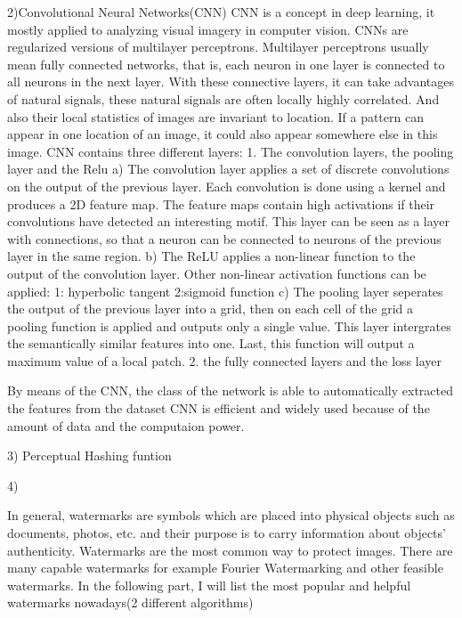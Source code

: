 2)Convolutional Neural Networks(CNN) %
CNN is a concept in deep learning, it mostly applied to analyzing visual imagery in computer vision.
CNNs are regularized versions of multilayer perceptrons. 
Multilayer perceptrons usually mean fully connected networks, that is, each neuron in one layer is connected to all neurons in the next layer. %
With these connective layers, it can take advantages of natural signals, 
these natural signals are often locally highly correlated.
And also their local statistics of images are invariant to location. 
If a pattern can appear in one location of an image, it could also appear somewhere else in this image.
CNN contains three different layers:
1. The convolution layers, the pooling layer and the Relu
a) The convolution layer applies a set of discrete convolutions on the output of the previous layer. 
Each convolution is done using a kernel and produces a 2D feature map. 
The feature maps contain high activations if their convolutions have detected an interesting motif. 
This layer can be seen as a layer with connections, 
so that a neuron can be connected to neurons of the previous layer in the same region. 
b) The ReLU applies a non-linear function to the output of the convolution layer. 
Other non-linear activation functions can be applied: 1: hyperbolic tangent 2:sigmoid function 
c) The pooling layer seperates the output of the previous layer into a grid, 
then on each cell of the grid a pooling function is applied and outputs only a single value.
This layer intergrates the semantically similar features into one.
Last, this function will output a maximum value of a local patch.
2. the fully connected layers and the loss layer



By means of the CNN, the class of the network is able to automatically extracted the features from the dataset
CNN is efficient and widely used because of the amount of data and the computaion power.




3) Perceptual Hashing funtion






4)

In general, 
watermarks are symbols which are placed into physical objects such as documents, photos, etc. and their purpose is to carry information about objects’ authenticity.
Watermarks are the most common way to protect images.
There are many capable watermarks for example Fourier Watermarking and other feasible watermarks.
In the following part, I will list the most popular and helpful watermarks nowadays(2 different algorithms)


